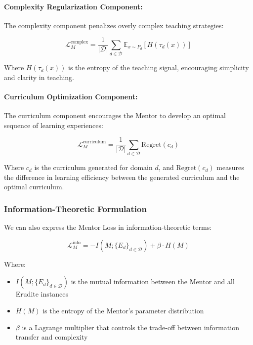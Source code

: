 \paragraph{Complexity Regularization Component:}
The complexity component penalizes overly complex teaching strategies:

\begin{equation}
\mathcal{L}_M^{\text{complex}} = \frac{1}{|\mathcal{D}|} \sum_{d \in \mathcal{D}} \mathbb{E}_{x \sim P_d} [H(\tau_d(x))]
\end{equation}

Where $H(\tau_d(x))$ is the entropy of the teaching signal, encouraging simplicity and clarity in teaching.

\paragraph{Curriculum Optimization Component:}
The curriculum component encourages the Mentor to develop an optimal sequence of learning experiences:

\begin{equation}
\mathcal{L}_M^{\text{curriculum}} = \frac{1}{|\mathcal{D}|} \sum_{d \in \mathcal{D}} \text{Regret}(c_d)
\end{equation}

Where $c_d$ is the curriculum generated for domain $d$, and $\text{Regret}(c_d)$ measures the difference in learning efficiency between the generated curriculum and the optimal curriculum.

\subsubsection{Information-Theoretic Formulation}

We can also express the Mentor Loss in information-theoretic terms:

\begin{equation}
\mathcal{L}_M^{\text{info}} = -I(M; \{E_d\}_{d \in \mathcal{D}}) + \beta \cdot H(M)
\end{equation}

Where:
\begin{itemize}
\item $I(M; \{E_d\}_{d \in \mathcal{D}})$ is the mutual information between the Mentor and all Erudite instances
\item $H(M)$ is the entropy of the Mentor's parameter distribution
\item $\beta$ is a Lagrange multiplier that controls the trade-off between information transfer and complexity
\end{itemize}

